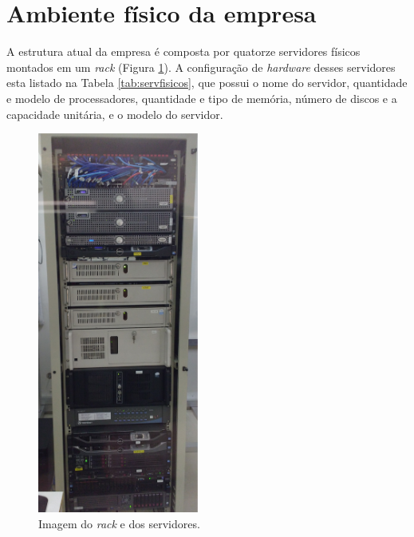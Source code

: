 \section{Ambiente físico da empresa}
\label{section:ambiente}

A estrutura atual da empresa é composta por quatorze servidores físicos montados em um \textit{rack} (Figura \ref{fig:servrack}). 
A configuração de \textit{hardware} desses servidores esta listado na Tabela \ref{tab:servfisicos}, que possui o nome do servidor, 
quantidade e modelo de processadores, quantidade e tipo de memória, número de discos e a capacidade unitária, e o modelo do servidor.

\begin{figure}[servrack]
 \centering
 \includegraphics[width=200px]{img/servrack.eps}
 \caption{Imagem do \textit{rack} e dos servidores.}
 \label{fig:servrack}
\end{figure}

